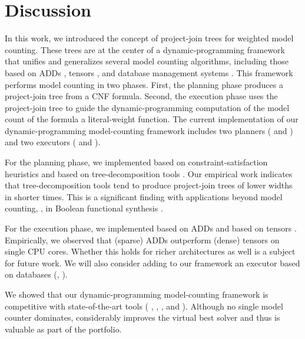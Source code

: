 \section{Discussion}
\label{sec_discussion}

In this work, we introduced the concept of project-join trees for weighted model counting.
These trees are at the center of a dynamic-programming framework that unifies and generalizes several model counting algorithms, including those based on ADDs \cite{dudek2020addmc}, tensors \cite{dudek2019efficient}, and database management systems \cite{fichte2020exploiting}.
This framework performs model counting in two phases.
First, the planning phase produces a project-join tree from a CNF formula.
Second, the execution phase uses the project-join tree to guide the dynamic-programming computation of the model count of the formula \wrt{} a literal-weight function.
The current implementation of our dynamic-programming model-counting framework \Dpmc{} includes two planners (\Htb{} and \Lg) and two executors (\Dmc{} and \Tensor{}).

For the planning phase, we implemented \Htb{} based on constraint-satisfaction heuristics
\cite{tarjan1984simple,koster2001treewidth,dechter2003constraint,dechter1999bucket,bouquet1999gestion}
and \Lg{} based on tree-decomposition tools \cite{strasser2017computing,tamaki2019positive,abseher2017htd}.
Our empirical work indicates that tree-decomposition tools tend to produce project-join trees of lower widths in shorter times.
This is a significant finding with applications beyond model counting, \eg, in Boolean functional synthesis \cite{tabajara2017factored}.

For the execution phase, we implemented \Dmc{} based on ADDs \cite{dudek2020addmc,somenzi2015cudd} and \Tensor{} based on tensors \cite{dudek2019efficient,numpy}.
Empirically, we observed that (sparse) ADDs outperform (dense) tensors on single CPU cores.
Whether this holds for richer architectures as well is a subject for future work.
We will also consider adding to our framework an executor based on databases (\eg, \cite{fichte2020exploiting}).

We showed that our dynamic-programming model-counting framework \Dpmc{} is competitive with state-of-the-art tools (\cachet{} \cite{sang2004combining}, \ctd{} \cite{darwiche2004new}, \df{} \cite{lagniez2017improved}, and \minictd{} \cite{oztok2015top}).
Although no single model counter dominates,
\Dpmc{} considerably improves the virtual best solver and thus is valuable as part of the portfolio.

